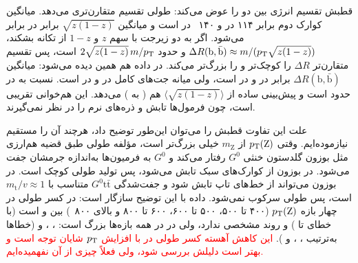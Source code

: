
قطبش تقسیم انرژی بین دو \bq{} را عوض می‌کند: \Zbos{} طولی تقسیم متقارن‌تری می‌دهد. میانگین \pt کوارک \bq{} دوم برابر ۱۱۴ در \Zjet و ۱۴۰~ در \ttZ است و میانگین $\sqrt{z(1-z)}$ برابر  در برابر  می‌شود. اگر \Zbos{} به دو زیرجت با سهم $z$ و $1-z$ از تکانه بشکند، $\Delta R(\mathrm{b},\bar{\mathrm b})\approx m/(p_\mathrm{T}\sqrt{z(1-z)})$ و  حدود $2\sqrt{z(1-z)}\,m/p_\mathrm{T}$ است، پس تقسیم متقارن‌تر $\Delta R$ را کوچک‌تر و  را بزرگ‌تر می‌کند. در داده هم همین دیده می‌شود: میانگین $\Delta R(\mathrm{b},\bar{\mathrm b})$ برابر  در \Zjet و  در \ttZ است، ولی میانه  جت‌های کامل  در \Zjet و  در \ttZ است. نسبت \ttZ به \Zjet در  حدود  است و پیش‌بینی ساده از $\langle\sqrt{z(1-z)}\rangle$ هم  ( به ) می‌دهد. این هم‌خوانی تقریبی است، چون فرمول‌ها تابش و ذره‌های نرم را در نظر نمی‌گیرند.

علت این تفاوت قطبش را می‌توان این‌طور توضیح داد، هرچند آن را مستقیم نیازموده‌ایم. وقتی $p_\mathrm{T}(\mathrm{Z})$ از $m_\mathrm{Z}$ خیلی بزرگ‌تر است، مؤلفه طولی \Zbos طبق قضیه هم‌ارزی مثل بوزون گلدستون خنثی $G^0$ رفتار می‌کند و $G^0$ به فرمیون‌ها به‌اندازه جرمشان جفت می‌شود. در \Zjet بوزون \Zbos از کوارک‌های سبک تابش می‌شود، پس تولید \Zbos طولی کوچک است. در \ttZ بوزون \Zbos می‌تواند از خط‌های تاپ تابش شود و جفت‌شدگی $G^0\mathrm{t}\bar{\mathrm{t}}$ متناسب با $m_\mathrm{t}/v\approx1$ است، پس \Zbos طولی سرکوب نمی‌شود. داده با این توضیح سازگار است: در \Zjet کسر طولی در چهار بازه $p_\mathrm{T}(\mathrm{Z})$ (۴۰۰ تا ۵۰۰، ۵۰۰ تا ۶۰۰، ۶۰۰ تا ۸۰۰ و بالای ۸۰۰~) بین  و  است (با خطای  تا ) و روند مشخصی ندارد، ولی در \ttZ در همه بازه‌ها بزرگ است: ، ،  و  (خطاها به‌ترتیب ، ،  و ). \textcolor{red}{این کاهش آهسته کسر طولی در \ttZ با افزایش $p_\mathrm{T}$ شایان توجه است و بهتر است دلیلش بررسی شود، ولی فعلاً چیزی از آن نفهمیده‌ایم.}


